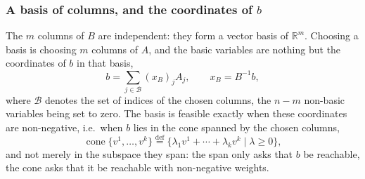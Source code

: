 \documentclass[aspectratio=169]{beamer}
\providecommand{\red}{\color{red}}
\def\RR{\mathbb{R}}
\begin{document}
\begin{frame}
\frametitle{A basis of columns, and the coordinates of $b$}

The $m$ columns of $B$ are independent: they form a {\red vector basis of $\RR^m$}.
Choosing a basis is choosing $m$ columns of $A$, and the basic variables are nothing but the {\red coordinates of $b$ in that basis},
\[
b = \sum_{j \in \mathcal{B}} (x_B)_j A_j, \qquad x_B = B^{-1}b,
\]
where $\mathcal{B}$ denotes the set of indices of the chosen columns, the $n-m$ non-basic variables being set to zero.
The basis is {\red feasible} exactly when these coordinates are non-negative, i.e.\ when $b$ lies in the {\red cone} spanned by the chosen columns,
\[
\operatorname{cone}\lbrace v^1, \ldots, v^k \rbrace \overset{\mathrm{def}}{=} \lbrace \lambda_1 v^1 + \cdots + \lambda_k v^k \mid \lambda \geq 0 \rbrace,
\]
and not merely in the subspace they span: the span only asks that $b$ be reachable, the cone asks that it be reachable with {\red non-negative} weights.

\end{frame}
\end{document}
